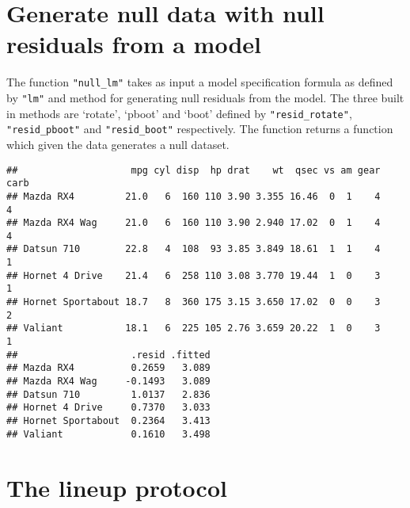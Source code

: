 \section{Generate null data with null residuals from a
model}\label{generate-null-data-with-null-residuals-from-a-model}

The function \texttt{"null\_lm"} takes as input a model specification
formula as defined by \texttt{"lm"} and method for generating null
residuals from the model. The three built in methods are `rotate',
`pboot' and `boot' defined by \texttt{"resid\_rotate"},
\texttt{"resid\_pboot"} and \texttt{"resid\_boot"} respectively. The
function returns a function which given the data generates a null
dataset.

\begin{Shaded}
\begin{Highlighting}[]
\NormalTok{(} 
\end{Highlighting}
\end{Shaded}

\begin{verbatim}
##                    mpg cyl disp  hp drat    wt  qsec vs am gear carb
## Mazda RX4         21.0   6  160 110 3.90 3.355 16.46  0  1    4    4
## Mazda RX4 Wag     21.0   6  160 110 3.90 2.940 17.02  0  1    4    4
## Datsun 710        22.8   4  108  93 3.85 3.849 18.61  1  1    4    1
## Hornet 4 Drive    21.4   6  258 110 3.08 3.770 19.44  1  0    3    1
## Hornet Sportabout 18.7   8  360 175 3.15 3.650 17.02  0  0    3    2
## Valiant           18.1   6  225 105 2.76 3.659 20.22  1  0    3    1
##                    .resid .fitted
## Mazda RX4          0.2659   3.089
## Mazda RX4 Wag     -0.1493   3.089
## Datsun 710         1.0137   2.836
## Hornet 4 Drive     0.7370   3.033
## Hornet Sportabout  0.2364   3.413
## Valiant            0.1610   3.498
\end{verbatim}

\section{The lineup protocol}\label{the-lineup-protocol}

